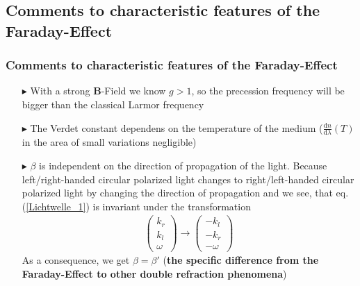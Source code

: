 \documentclass[11pt,a4paper]{beamer}
\begin{document}
\begin{frame}
\subsection{Comments to characteristic features of the Faraday-Effect}
\frametitle{Comments to characteristic features of the Faraday-Effect}
\begin{itemize}
\item[$\blacktriangleright$] With a strong \textbf{B}-Field we know $g > 1$, so the precession frequency will be bigger than the classical Larmor frequency
\item[$\blacktriangleright$] The Verdet constant dependens on the temperature of the medium ($\frac{\text{d} n}{\text{d} \lambda}(T)$ in the area of small variations negligible)
\item[$\blacktriangleright$] $\beta$ is independent on the direction of propagation of the light.
Because left/right-handed circular polarized light changes to right/left-handed circular polarized light by changing the direction of propagation and
we see, that eq. (\ref{Lichtwelle_1}) is invariant under the transformation 
\begin{align}
\begin{pmatrix}
k_r \\
k_l \\
\omega
\end{pmatrix} \rightarrow 
\begin{pmatrix}
-k_l\\
-k_r\\
-\omega
\end{pmatrix}
\end{align}
As a consequence, we get $\beta = \beta'$ \newline(\textbf{the specific difference from the Faraday-Effect to other double refraction phenomena})
\end{itemize}
\end{frame}
\begin{frame}
\end{frame}
\end{document}
